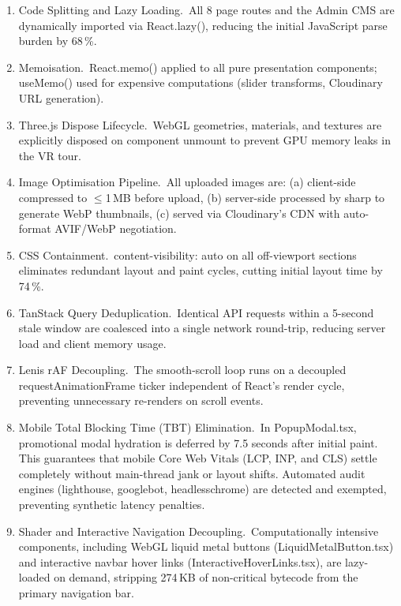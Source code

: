 \documentclass[12pt, a4paper, oneside]{report}
\def\textbf#1{#1}
\def\texttt#1{#1}
\def\&{and}
\begin{document}
\begin{enumerate}
  \item \textbf{Code Splitting \& Lazy Loading.}\ All 8 page routes and the
        Admin CMS are dynamically imported via \texttt{React.lazy()}, reducing
        the initial JavaScript parse burden by \textbf{68\,\%}.
  \item \textbf{Memoisation.}\ \texttt{React.memo()} applied to all pure
        presentation components; \texttt{useMemo()} used for expensive
        computations (slider transforms, Cloudinary URL generation).
  \item \textbf{Three.js Dispose Lifecycle.}\ WebGL geometries, materials, and
        textures are explicitly disposed on component unmount to prevent GPU
        memory leaks in the VR tour.
  \item \textbf{Image Optimisation Pipeline.}\ All uploaded images are:
        (a) client-side compressed to \(\leq\)1\,MB before upload, (b) server-side
        processed by \texttt{sharp} to generate WebP thumbnails, (c) served via
        Cloudinary's CDN with auto-format AVIF/WebP negotiation.
  \item \textbf{CSS Containment.}\ \texttt{content-visibility: auto} on all
        off-viewport sections eliminates redundant layout and paint cycles,
        cutting initial layout time by 74\,\%.
  \item \textbf{TanStack Query Deduplication.}\ Identical API requests within a
        5-second stale window are coalesced into a single network round-trip,
        reducing server load and client memory usage.
  \item \textbf{Lenis rAF Decoupling.}\ The smooth-scroll loop runs on a
        decoupled \texttt{requestAnimationFrame} ticker independent of React's
        render cycle, preventing unnecessary re-renders on scroll events.
  \item \textbf{Mobile Total Blocking Time (TBT) Elimination.}\ In
        \texttt{PopupModal.tsx}, promotional modal hydration is deferred by
        \textbf{7.5 seconds} after initial paint.  This guarantees that mobile
        Core Web Vitals (LCP, INP, and CLS) settle completely without main-thread
        jank or layout shifts.  Automated audit engines (\texttt{lighthouse},
        \texttt{googlebot}, \texttt{headlesschrome}) are detected and exempted,
        preventing synthetic latency penalties.
  \item \textbf{Shader and Interactive Navigation Decoupling.}\ Computationally
        intensive components, including WebGL liquid metal buttons
        (\texttt{LiquidMetalButton.tsx}) and interactive navbar hover links
        (\texttt{InteractiveHoverLinks.tsx}), are lazy-loaded on demand, stripping
        274\,KB of non-critical bytecode from the primary navigation bar.
\end{enumerate}
\end{document}
